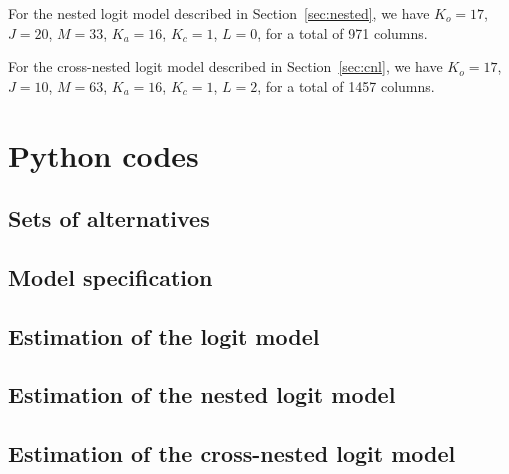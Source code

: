 \documentclass[12pt,a4paper]{article}
\newcommand*{\examplesPath}{../../docs/examples}
\begin{document}
For the nested logit model described in Section~\ref{sec:nested}, we have
$K_o=17$,
$J=20$,
$M=33$,
$K_a=16$,
$K_c=1$,
$L=0$, for a total of 971 columns.

For the cross-nested logit model described in Section~\ref{sec:cnl}, we have
$K_o=17$,
$J=10$, 
$M=63$, 
$K_a=16$,
$K_c=1$,
$L=2$, for a total of 1457 columns.


\section{Python codes}

\subsection{Sets of alternatives}
\label{sec:alternatives}


\subsection{Model specification}
\label{sec:specification}


\subsection{Estimation of the logit model}
\label{sec:logitcode}


\subsection{Estimation of the nested logit model}
\label{sec:nestedcode}


\subsection{Estimation of the cross-nested logit model}
\label{sec:cnlcode}

\end{document}
